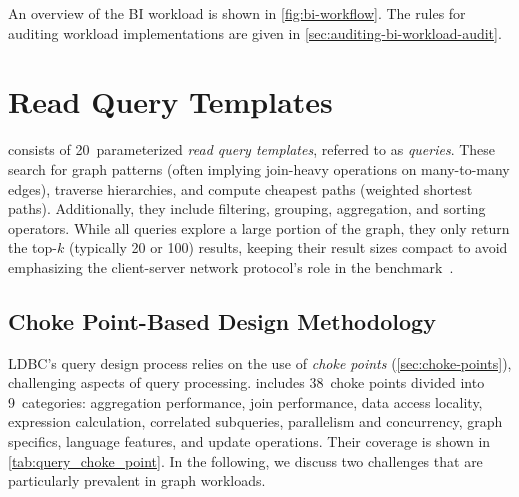 An overview of the BI workload is shown in \autoref{fig:bi-workflow}.
The rules for auditing workload implementations are given in \autoref{sec:auditing-bi-workload-audit}.

\section{Read Query Templates}
\label{sec:queries}


\snbbi consists of 20~parameterized \emph{read query templates}, referred to as \emph{queries}. These search for graph patterns (often implying join-heavy operations on many-to-many edges), traverse hierarchies, and compute cheapest paths (\aka weighted shortest paths).
Additionally, they include filtering, grouping, aggregation, and sorting operators.
While all queries explore a large portion of the graph, they only return the top-$k$ (typically 20 or 100) results,
keeping their result sizes compact to avoid emphasizing the client-server network protocol's role in the benchmark~\cite{DBLP:journals/pvldb/RaasveldtM17}.

\subsection{Choke Point-Based Design Methodology}

LDBC's query design process relies on the use of \emph{choke points} (\autoref{sec:choke-points}),
\ie challenging aspects of query processing.
\snbbi includes 38~choke points divided into 9~categories:
aggregation performance,
join performance,
data access locality,
expression calculation,
correlated subqueries,
parallelism and concurrency,
graph specifics,
language features,
and
update operations.
Their coverage is shown in \autoref{tab:query_choke_point}.
In the following, we discuss two challenges that are particularly prevalent in graph workloads.

